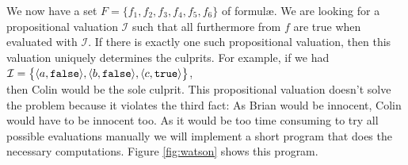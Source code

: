 We now have a set $F = \{ f_1, f_2, f_3, f_4, f_5, f_6 \}$ of {formul\ae}.
We are looking for a propositional valuation $\mathcal{I}$ such that all furthermore from
$f$ are true when evaluated with $\mathcal{I}$.  If there is exactly one such
propositional valuation, then this valuation uniquely determines the culprits.
For example, if we had
 \\[0.2cm]
\hspace*{1.3cm} 
$\mathcal{I} = \bigl\{ \pair(a,\mathtt{false}), \pair(b,\mathtt{false}), \pair(c,\mathtt{true}) \bigr\}$,
\\[0.2cm]
then Colin would be the sole culprit.  This propositional valuation doesn't solve the
problem because it violates the third fact:  As Brian would be
innocent, Colin would have to be innocent too.
As it would be too time consuming to try all possible evaluations manually we will
implement a short program that does the necessary computations.
Figure \ref{fig:watson} shows this program.

